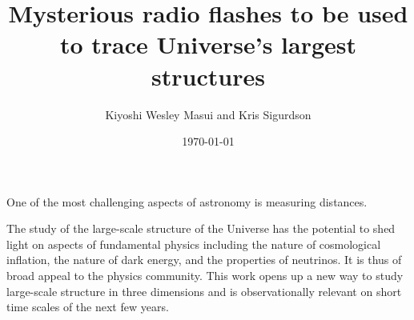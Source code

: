 \documentclass{article}
\title{Mysterious radio flashes to be used to trace Universe's largest
structures}
\date{\today}
\author{Kiyoshi Wesley Masui and Kris Sigurdson}
\begin{document}
\maketitle

One of the most challenging aspects of astronomy is measuring distances.


The study of the large-scale structure of the Universe has the potential to
shed light on aspects of fundamental physics including the nature of
cosmological inflation, the nature of dark energy, and the properties of
neutrinos.  It is thus of broad appeal to the physics community. This work
opens up a new way to study large-scale structure in three dimensions and is
observationally relevant on short time scales of the next few years.
\end{document}
